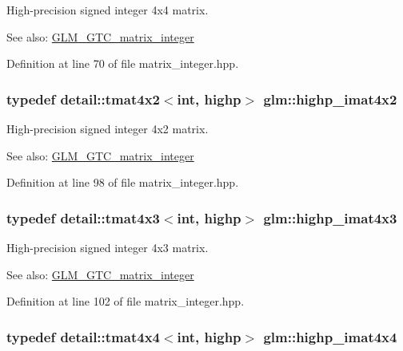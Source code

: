 High-precision signed integer 4x4 matrix. \begin{Desc}
\item[See also:]\hyperlink{group__gtc__matrix__integer}{GLM\_\-GTC\_\-matrix\_\-integer} \end{Desc}


Definition at line 70 of file matrix\_\-integer.hpp.\hypertarget{group__gtc__matrix__integer_gd998dce143f674a95a25241ff6e5e7d2}{
\subsubsection[highp\_\-imat4x2]{\setlength{\rightskip}{0pt plus 5cm}typedef detail::tmat4x2$<$int, highp$>$ {\bf glm::highp\_\-imat4x2}}}
\label{group__gtc__matrix__integer_gd998dce143f674a95a25241ff6e5e7d2}


High-precision signed integer 4x2 matrix. \begin{Desc}
\item[See also:]\hyperlink{group__gtc__matrix__integer}{GLM\_\-GTC\_\-matrix\_\-integer} \end{Desc}


Definition at line 98 of file matrix\_\-integer.hpp.\hypertarget{group__gtc__matrix__integer_g9d51b6f1c8cd0b23c6fcc8dca924b14c}{
\subsubsection[highp\_\-imat4x3]{\setlength{\rightskip}{0pt plus 5cm}typedef detail::tmat4x3$<$int, highp$>$ {\bf glm::highp\_\-imat4x3}}}
\label{group__gtc__matrix__integer_g9d51b6f1c8cd0b23c6fcc8dca924b14c}


High-precision signed integer 4x3 matrix. \begin{Desc}
\item[See also:]\hyperlink{group__gtc__matrix__integer}{GLM\_\-GTC\_\-matrix\_\-integer} \end{Desc}


Definition at line 102 of file matrix\_\-integer.hpp.\hypertarget{group__gtc__matrix__integer_g969c88d5c7530beb80768205a054ee80}{
\subsubsection[highp\_\-imat4x4]{\setlength{\rightskip}{0pt plus 5cm}typedef detail::tmat4x4$<$int, highp$>$ {\bf glm::highp\_\-imat4x4}}}
\label{group__gtc__matrix__integer_g969c88d5c7530beb80768205a054ee80}


